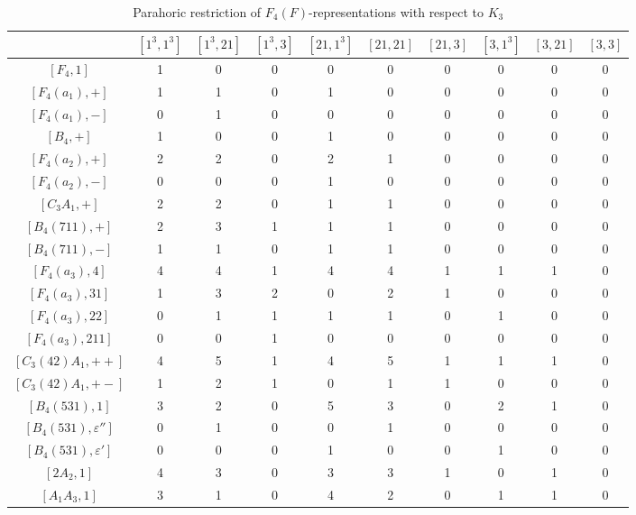     \begin{table}[!ht]
        \centering
        \caption{Parahoric restriction of $F_4(F)$-representations with respect to $K_3$} \label{tbl:F4_K3_1}
        \begin{adjustbox}{max width=\linewidth}
        \begin{tabular}{|c|ccccccccc|}
            \hline
        & $[1^3,1^3]$ & $[1^3,21]$ & $[1^3,3]$ & $[21,1^3]$ & $[21,21]$ & $[21,3]$ & $[3,1^3]$ & $[3,21]$ & $[3,3]$ \\\hline
        $[F_4,1]$ & 1 & 0 & 0 & 0 & 0 & 0 & 0 & 0 & 0 \\\hline
        $[F_4(a_1),+]$ & 1 & 1 & 0 & 1 & 0 & 0 & 0 & 0 & 0 \\
        $[F_4(a_1),-]$ & 0 & 1 & 0 & 0 & 0 & 0 & 0 & 0 & 0 \\
        $[B_4,+]$ & 1 & 0 & 0 & 1 & 0 & 0 & 0 & 0 & 0 \\\hline
        $[F_4(a_2),+]$ & 2 & 2 & 0 & 2 & 1 & 0 & 0 & 0 & 0 \\
        $[F_4(a_2),-]$ & 0 & 0 & 0 & 1 & 0 & 0 & 0 & 0 & 0 \\
        $[C_3A_1,+]$ & 2 & 2 & 0 & 1 & 1 & 0 & 0 & 0 & 0 \\\hline
        $[B_4(711),+]$ & 2 & 3 & 1 & 1 & 1 & 0 & 0 & 0 & 0 \\
        $[B_4(711),-]$ & 1 & 1 & 0 & 1 & 1 & 0 & 0 & 0 & 0 \\\hline
        $[F_4(a_3),4]$ & 4 & 4 & 1 & 4 & 4 & 1 & 1 & 1 & 0 \\
        $[F_4(a_3),31]$ & 1 & 3 & 2 & 0 & 2 & 1 & 0 & 0 & 0 \\
        $[F_4(a_3),22]$ & 0 & 1 & 1 & 1 & 1 & 0 & 1 & 0 & 0 \\
        $[F_4(a_3),211]$ & 0 & 0 & 1 & 0 & 0 & 0 & 0 & 0 & 0 \\
        $[C_3(42)A_1,++]$ & 4 & 5 & 1 & 4 & 5 & 1 & 1 & 1 & 0 \\
        $[C_3(42)A_1,+-]$ & 1 & 2 & 1 & 0 & 1 & 1 & 0 & 0 & 0 \\
        $[B_4(531),1]$ & 3 & 2 & 0 & 5 & 3 & 0 & 2 & 1 & 0 \\
        $[B_4(531),\varepsilon'']$ & 0 & 1 & 0 & 0 & 1 & 0 & 0 & 0 & 0 \\
        $[B_4(531),\varepsilon']$ & 0 & 0 & 0 & 1 & 0 & 0 & 1 & 0 & 0 \\
        $[2A_2,1]$ & {4} & {3} & 0 & {3} & {3} & 1 & 0 & 1 & 0 \\
        $[A_1A_3,1]$ & 3 & 1 & 0 & 4 & 2 & 0 & 1 & 1 & 0 \\\hline
        \end{tabular}
        \end{adjustbox}
    \end{table}

